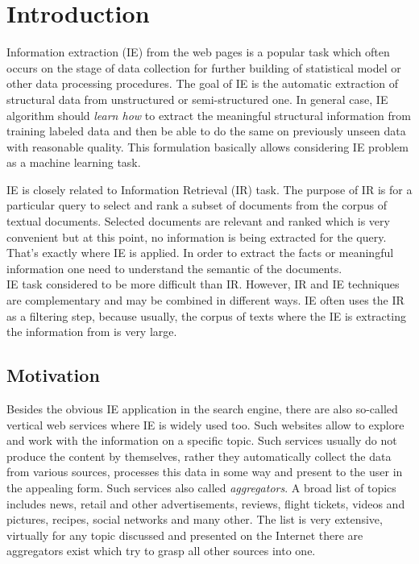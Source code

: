 \chapter{Introduction}
\label{chap:intro}
Information extraction (IE) from the web pages is a popular task which often occurs on the stage of data collection for further building of statistical model or other data processing procedures. The goal of IE is the automatic extraction of structural data from unstructured or semi-structured one. In general case, IE algorithm should \textit{learn how} to extract the meaningful structural information from training labeled data and then be able to do the same on previously unseen data with reasonable quality. This formulation basically allows considering IE problem as a machine learning task.

IE is closely related to Information Retrieval (IR) task. The purpose of IR is for a particular query to select and rank a subset of documents from the corpus of textual documents. Selected documents are relevant and ranked which is very convenient but at this point, no information is being extracted for the query. That's exactly where IE is applied. In order to extract the facts or meaningful information one need to understand the semantic of the documents.\\

IE task considered to be more difficult than IR. However, IR and IE techniques are complementary and may be combined in different ways. IE often uses the IR as a filtering step, because usually, the corpus of texts where the IE is extracting the information from is very large.\\

\cite{IEstate}




\section{Motivation}
Besides the obvious IE application in the search engine, there are also so-called vertical web services where IE is widely used too. Such websites allow to explore and work with the information on a specific topic. Such services usually do not produce the content by themselves, rather they automatically collect the data from various sources, processes this data in some way and present to the user in the appealing form. Such services also called \textit{aggregators}. A broad list of topics includes news, retail and other advertisements, reviews, flight tickets, videos and pictures, recipes, social networks and many other. The list is very extensive, virtually for any topic discussed and presented on the Internet there are aggregators exist which try to grasp all other sources into one. \\

